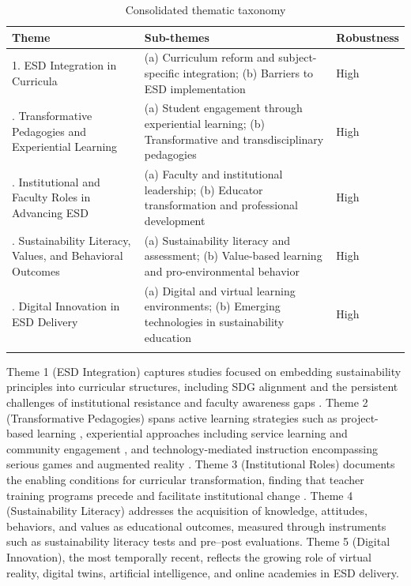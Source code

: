 \documentclass[pdflatex,sn-basic]{sn-jnl}%
\begin{document}
\begin{table}[htbp]
\centering
\caption{Consolidated thematic taxonomy}\label{tab:thematic_tax}
\begin{tabular*}{\textwidth}{p{4cm}p{6.5cm}p{1cm}}
\toprule
\textbf{Theme} & \textbf{Sub-themes} & \textbf{Robustness} \\
\midrule
1. ESD Integration in Curricula & (a) Curriculum reform and subject-specific integration; (b) Barriers to ESD implementation & High \\ \addlinespace
2. Transformative Pedagogies and Experiential Learning & (a) Student engagement through experiential learning; (b) Transformative and transdisciplinary pedagogies & High \\ \addlinespace
3. Institutional and Faculty Roles in Advancing ESD & (a) Faculty and institutional leadership; (b) Educator transformation and professional development & High \\ \addlinespace
4. Sustainability Literacy, Values, and Behavioral Outcomes & (a) Sustainability literacy and assessment; (b) Value-based learning and pro-environmental behavior & High \\ \addlinespace
5. Digital Innovation in ESD Delivery & (a) Digital and virtual learning environments; (b) Emerging technologies in sustainability education & High \\
\botrule
\end{tabular*}
\end{table}

Theme 1 (ESD Integration) captures studies focused on embedding sustainability principles into curricular structures, including SDG alignment \cite{ahmad_codesigns_2023, balan_connecting_2025} and the persistent challenges of institutional resistance and faculty awareness gaps \cite{acosta-castellanos_education_2022}. Theme 2 (Transformative Pedagogies) spans active learning strategies such as project-based learning \cite{du_university_2022}, experiential approaches including service learning and community engagement \cite{alvarez-vanegas_empowering_2024}, and technology-mediated instruction encompassing serious games \cite{cravero_learning_2021} and augmented reality \cite{czok_learning_2023}. Theme 3 (Institutional Roles) documents the enabling conditions for curricular transformation, finding that teacher training programs precede and facilitate institutional change \cite{biasutti_educating_2018}. Theme 4 (Sustainability Literacy) addresses the acquisition of knowledge, attitudes, behaviors, and values as educational outcomes, measured through instruments such as sustainability literacy tests and pre--post evaluations. Theme 5 (Digital Innovation), the most temporally recent, reflects the growing role of virtual reality, digital twins, artificial intelligence, and online academies in ESD delivery.
\end{document}
